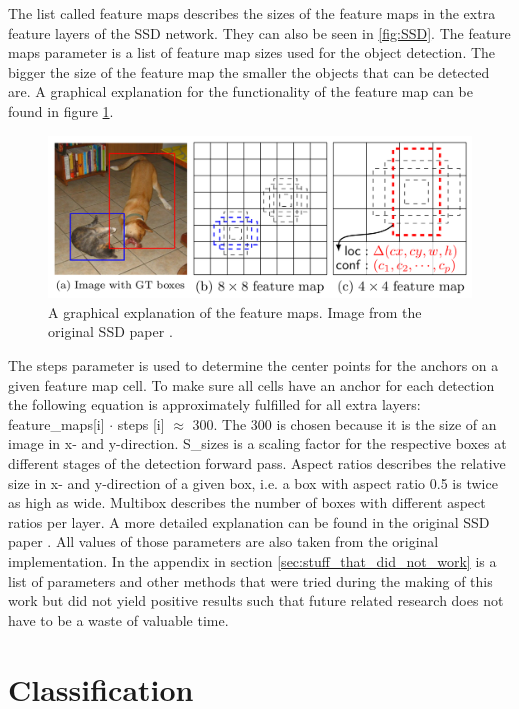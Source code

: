 The list called feature maps describes the sizes of the feature maps in the extra feature layers of the SSD network. They can also be seen in \ref{fig:SSD}. 
The feature maps parameter is a list of feature map sizes used for the object detection. The bigger the size of the feature map the smaller the objects that can be detected are. A graphical explanation for the functionality of the feature map can be found in figure \ref{fig:SSD_feature_maps}.

\begin{figure}[!htb]
	\centering
	\includegraphics[width=\textwidth]{images/SSD_feature_maps}
	\caption{A graphical explanation of the feature maps. Image from the original SSD paper \cite{SSD}.}
	\label{fig:SSD_feature_maps}
\end{figure}

The steps parameter is used to determine the center points for the anchors on a given feature map cell. To make sure all cells have an anchor for each detection the following equation is approximately fulfilled for all extra layers: feature\_maps[i] $\cdot$ steps [i] $\approx$ 300. The 300 is chosen because it is the size of an image in x- and y-direction. S\_sizes is a scaling factor for the respective boxes at different stages of the detection forward pass. Aspect ratios describes the relative size in x- and y-direction of a given box, i.e. a box with aspect ratio 0.5 is twice as high as wide. Multibox describes the number of boxes with different aspect ratios per layer. A more detailed explanation can be found in the original SSD paper \cite{SSD}. All values of those parameters are also taken from the original implementation. In the appendix in section \ref{sec:stuff_that_did_not_work} is a list of parameters and other methods that were tried during the making of this work but did not yield positive results such that future related research does not have to be a waste of valuable time. 


\section{Classification}

